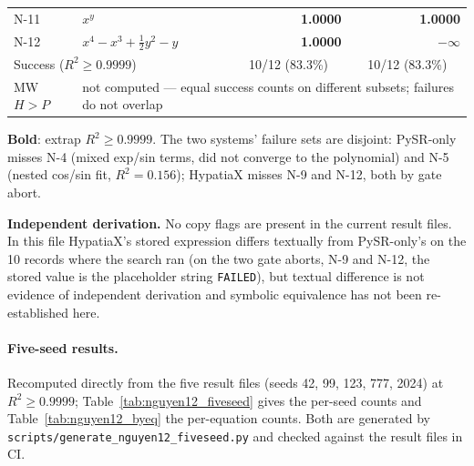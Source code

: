 \documentclass[twoside,11pt]{article}
\newcommand{\Rsq}{R^{2}}
\begin{document}
\begin{table}[h]
\begin{threeparttable}
\begin{tabular}{llrr}
N-11 & $x^y$                                         & \textbf{1.0000} & \textbf{1.0000} \\
N-12 & $x^4 - x^3 + \tfrac{1}{2}y^2 - y$              & \textbf{1.0000} & $-\infty$ \\
\midrule
\multicolumn{2}{l}{Success ($\Rsq\ge0.9999$)}
  & \multicolumn{1}{c}{10/12 (83.3\%)}
  & \multicolumn{1}{c}{10/12 (83.3\%)} \\
MW $H>P$   & \multicolumn{3}{l}{not computed --- equal success counts on different subsets; failures do not overlap} \\
\bottomrule
\end{tabular}
\begin{tablenotes}\small
  \item \textbf{Bold}: extrap $\Rsq \ge 0.9999$. The two systems' failure sets are
    disjoint: PySR-only misses N-4 (mixed exp/sin terms, did not converge to the
    polynomial) and N-5 (nested cos/sin fit, $\Rsq=0.156$); HypatiaX misses N-9
    and N-12, both by gate abort.
  \item[$\ddag$] \textbf{Independent derivation.} No copy flags are present in the current
    result files. In this file HypatiaX's stored expression differs textually from
    PySR-only's on the 10 records where the search ran (on the two gate aborts, N-9 and
    N-12, the stored value is the placeholder string \texttt{FAILED}), but textual difference is not evidence of
    independent derivation and symbolic equivalence has not been re-established here.
\end{tablenotes}
\end{threeparttable}
\end{table}

\paragraph{Five-seed results.} Recomputed directly from the
five result files (seeds 42, 99, 123, 777, 2024) at $\Rsq\ge0.9999$;
Table~\ref{tab:nguyen12_fiveseed} gives the per-seed counts and
Table~\ref{tab:nguyen12_byeq} the per-equation counts. Both are generated by
\texttt{scripts/generate\_nguyen12\_fiveseed.py} and checked against the result files in CI.
\end{document}

